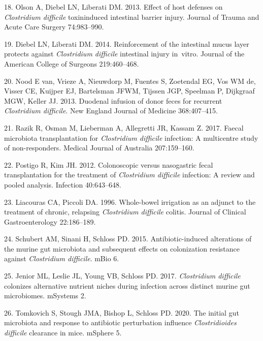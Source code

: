 \documentclass[
  11pt,
]{article}
\begin{document}
\leavevmode\hypertarget{ref-Olson2013}{}%
18. Olson A, Diebel LN, Liberati DM. 2013. Effect of host defenses on
\emph{Clostridium difficile} toxininduced intestinal barrier injury.
Journal of Trauma and Acute Care Surgery 74:983--990.

\leavevmode\hypertarget{ref-Diebel2014}{}%
19. Diebel LN, Liberati DM. 2014. Reinforcement of the intestinal mucus
layer protects against \emph{Clostridium difficile} intestinal injury
in~vitro. Journal of the American College of Surgeons 219:460--468.

\leavevmode\hypertarget{ref-vanNood2013}{}%
20. Nood E van, Vrieze A, Nieuwdorp M, Fuentes S, Zoetendal EG, Vos WM
de, Visser CE, Kuijper EJ, Bartelsman JFWM, Tijssen JGP, Speelman P,
Dijkgraaf MGW, Keller JJ. 2013. Duodenal infusion of donor feces for
recurrent \emph{Clostridium difficile}. New England Journal of Medicine
368:407--415.

\leavevmode\hypertarget{ref-Razik2017}{}%
21. Razik R, Osman M, Lieberman A, Allegretti JR, Kassam Z. 2017. Faecal
microbiota transplantation for \emph{Clostridium difficile} infection: A
multicentre study of non-responders. Medical Journal of Australia
207:159--160.

\leavevmode\hypertarget{ref-Postigo2012}{}%
22. Postigo R, Kim JH. 2012. Colonoscopic versus nasogastric fecal
transplantation for the treatment of \emph{Clostridium difficile}
infection: A review and pooled analysis. Infection 40:643--648.

\leavevmode\hypertarget{ref-Liacouras1996}{}%
23. Liacouras CA, Piccoli DA. 1996. Whole-bowel irrigation as an adjunct
to the treatment of chronic, relapsing \emph{Clostridium difficile}
colitis. Journal of Clinical Gastroenterology 22:186--189.

\leavevmode\hypertarget{ref-Schubert2015}{}%
24. Schubert AM, Sinani H, Schloss PD. 2015. Antibiotic-induced
alterations of the murine gut microbiota and subsequent effects on
colonization resistance against \emph{Clostridium difficile}. mBio 6.

\leavevmode\hypertarget{ref-Jenior2017}{}%
25. Jenior ML, Leslie JL, Young VB, Schloss PD. 2017. \emph{Clostridium
difficile} colonizes alternative nutrient niches during infection across
distinct murine gut microbiomes. mSystems 2.

\leavevmode\hypertarget{ref-Tomkovich2020}{}%
26. Tomkovich S, Stough JMA, Bishop L, Schloss PD. 2020. The initial gut
microbiota and response to antibiotic perturbation influence
\emph{Clostridioides difficile} clearance in mice. mSphere 5.
\end{document}
